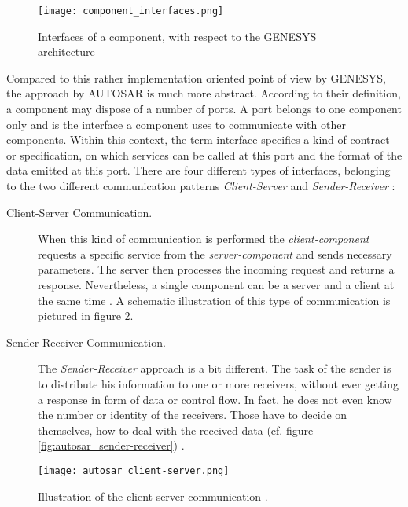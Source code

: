 \begin{figure}[!htbp]
\centering
\texttt{[image: component\_interfaces.png]}
\caption{Interfaces of a component, with respect to the GENESYS architecture \cite[p.40]{genesys}}
\label{fig:component_interfaces}
\end{figure}

Compared to this rather implementation oriented point of view by GENESYS, the approach by \mbox{AUTOSAR} is much more abstract. According to their definition, a component may dispose of a number of ports. A port belongs to one component only and is the interface a component uses to communicate with other components. Within this context, the term interface specifies a kind of contract or specification, on which services can be called at this port and the format of the data emitted at this port. There are four different types of interfaces, belonging to the two different communication patterns \emph{Client-Server} and \emph{Sender-Receiver} \cite{autosar_intro}:

\begin{description}
\item [Client-Server Communication.]
When this kind of communication is performed the \emph{client-component} requests a specific service from the \emph{server-component} and sends necessary parameters. The server then processes the incoming request and returns a response. Nevertheless, a single component can be a server and a client at the same time \cite{autosar_intro}. A schematic illustration of this type of communication is pictured in figure \ref{fig:autosar_client-server}.

\item [Sender-Receiver Communication.]
The \emph{Sender-Receiver} approach is a bit different. The task of the sender is to distribute his information to one or more receivers, without ever getting a response in form of data or control flow. In fact, he does not even know the number or identity of the receivers. Those have to decide on themselves, how to deal with the received data (cf. figure \ref{fig:autosar_sender-receiver}) \cite{autosar_intro}.
\end{description}

\begin{figure}[!htbp]
\centering
\texttt{[image: autosar\_client-server.png]}
\caption{Illustration of the client-server communication \cite{autosar_intro}.}
\label{fig:autosar_client-server}
\end{figure}

